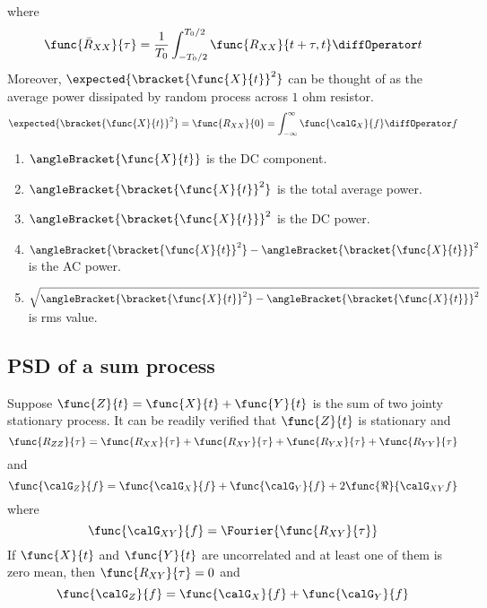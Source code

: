 where 
\begin{equation*}
    \func{\bar{R}_{XX}}{\tau} = \dfrac{1}{T_0} \int_{-T_0/2}^{T_0/2} \func{R_{XX}}{t + \tau,t} \diffOperator t
\end{equation*}
Moreover, \(\expected{\bracket{\func{X}{t}}^2}\) can be thought of as the average power dissipated by random process across \(1\) ohm resistor.
\begin{equation*}
    \expected{\bracket{\func{X}{t}}^2} = \func{R_{XX}}{0} = \int_{-\infty}^{\infty} \func{\calG_X}{f} \diffOperator f
\end{equation*}

\begin{enumerate}
    \item \(\angleBracket{\func{X}{t}}\) is the DC component.
    \item \(\angleBracket{\bracket{\func{X}{t}}^2}\) is the total average power.
    \item \(\angleBracket{\bracket{\func{X}{t}}}^2\) is the DC power.
    \item \(\angleBracket{\bracket{\func{X}{t}}^2} - \angleBracket{\bracket{\func{X}{t}}}^2\) is the AC power.
    \item \(\sqrt{\angleBracket{\bracket{\func{X}{t}}^2} - \angleBracket{\bracket{\func{X}{t}}}^2}\) is rms value.
\end{enumerate}
\subsection{PSD of a sum process}
Suppose \(\func{Z}{t} = \func{X}{t} + \func{Y}{t}\) is the sum of two jointy stationary process. It can be readily verified that \(\func{Z}{t}\) is stationary and 
\begin{equation*}
    \func{R_{ZZ}}{\tau} = \func{R_{XX}}{\tau} + \func{R_{XY}}{\tau} + \func{R_{YX}}{\tau} + \func{R_{YY}}{\tau}
\end{equation*}
and 
\begin{equation*}
    \func{\calG_Z}{f} = \func{\calG_X}{f} + \func{\calG_Y}{f} + 2 \func{\Re}{\calG_{XY}{f}} 
\end{equation*}
where 
\begin{equation*}
    \func{\calG_{XY}}{f} = \Fourier{\func{R_{XY}}{\tau}} 
\end{equation*}
If \(\func{X}{t}\) and \(\func{Y}{t}\) are uncorrelated and at least one of them is zero mean, then \(\func{R_{XY}}{\tau} = 0\) and 
\begin{equation*}
    \func{\calG_Z}{f} = \func{\calG_X}{f} + \func{\calG_Y}{f}
\end{equation*}
